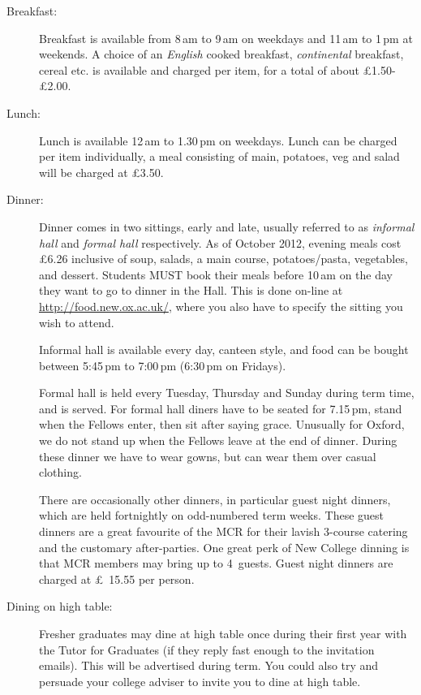 \begin{description}
\item[Breakfast:] Breakfast is available from 8\,am to 9\,am on weekdays
and 11\,am to 1\,pm at weekends. A choice of an \emph{English} cooked breakfast,
\emph{continental} breakfast, cereal etc. is available and charged per item, for
a total of about \pounds1.50-\pounds2.00.
\item[Lunch:] Lunch is available 12\,am to 1.30\,pm on weekdays. Lunch can be
charged per item individually, a meal consisting of main, potatoes, veg and
salad will be charged at \pounds3.50.
\item[Dinner:] 
Dinner comes in two sittings, early and late, usually referred to as \emph{informal
hall} and  \emph{formal hall} respectively. As of
October 2012, evening meals cost \pounds6.26 inclusive of soup, salads, a main
course, potatoes/pasta, vegetables, and dessert. Students MUST book their meals before
10\,am on the day they want to go to dinner in the Hall. This is done on-line at
\url{http://food.new.ox.ac.uk/}, where you also have to specify the sitting you
wish to attend.

Informal hall is available every day, canteen style, and food can be bought
between 5:45\,pm to 7:00\,pm (6:30\,pm on Fridays). 

Formal hall is held every Tuesday, Thursday and
Sunday during term time, and is served. For formal hall diners
have to be seated for 7.15\,pm, stand when the Fellows enter, then sit after
saying grace. Unusually for Oxford, we do not stand up when the Fellows leave
at the end of dinner. During these dinner we have to wear gowns, but can wear
them over casual clothing.

There are occasionally other dinners, in particular guest night dinners, which
are held fortnightly on odd-numbered term weeks. These guest dinners are a great
favourite of the MCR for their lavish 3-course catering and the customary
after-parties. One great perk of New College dinning is that MCR members may
bring up to 4~guests. Guest night dinners are charged at \pounds~15.55 per
person.

\item[Dining on high table:] Fresher graduates may dine at high table once
during their first year with the Tutor for Graduates (if they reply fast enough
to the invitation emails).
This will be advertised during term. You could also try and persuade your college adviser to invite you to dine at high table.
\end{description}

